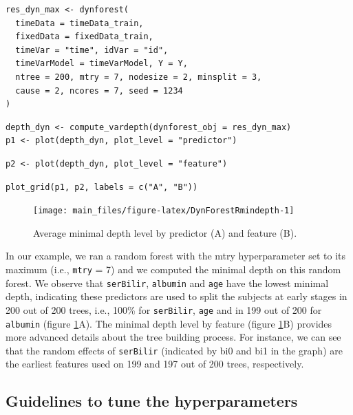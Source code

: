 \begin{verbatim}
res_dyn_max <- dynforest(
  timeData = timeData_train,
  fixedData = fixedData_train,
  timeVar = "time", idVar = "id",
  timeVarModel = timeVarModel, Y = Y,
  ntree = 200, mtry = 7, nodesize = 2, minsplit = 3,
  cause = 2, ncores = 7, seed = 1234
)
\end{verbatim}

\begin{verbatim}
depth_dyn <- compute_vardepth(dynforest_obj = res_dyn_max)
p1 <- plot(depth_dyn, plot_level = "predictor")
\end{verbatim}

\begin{verbatim}
p2 <- plot(depth_dyn, plot_level = "feature")
\end{verbatim}

\begin{verbatim}
plot_grid(p1, p2, labels = c("A", "B"))
\end{verbatim}

\begin{figure}

{\centering \texttt{[image: main\_files/figure-latex/DynForestRmindepth-1]} 

}

\caption{Average minimal depth level by predictor (A) and feature (B).}\label{fig:DynForestRmindepth}
\end{figure}

In our example, we ran a random forest with the mtry hyperparameter set to its maximum (i.e., \texttt{mtry} = 7) and we computed the minimal depth on this random forest. We observe that \texttt{serBilir}, \texttt{albumin} and \texttt{age} have the lowest minimal depth, indicating these predictors are used to split the subjects at early stages in 200 out of 200 trees, i.e., 100\% for \texttt{serBilir}, \texttt{age} and in 199 out of 200 for \texttt{albumin} (figure \ref{fig:DynForestRmindepth}A). The minimal depth level by feature (figure \ref{fig:DynForestRmindepth}B) provides more advanced details about the tree building process. For instance, we can see that the random effects of \texttt{serBilir} (indicated by bi0 and bi1 in the graph) are the earliest features used on 199 and 197 out of 200 trees, respectively.

\subsection{Guidelines to tune the hyperparameters}\label{guidelines-to-tune-the-hyperparameters}

